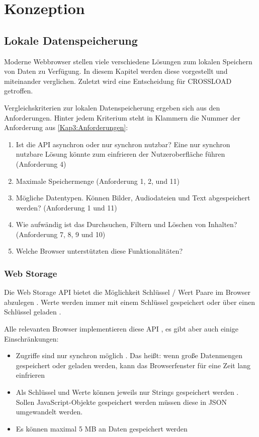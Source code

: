 \chapter{Konzeption}
\label{Kap4}

\section{Lokale Datenspeicherung}
Moderne Webbrowser stellen viele verschiedene Lösungen zum lokalen Speichern von Daten zu Verfügung. In diesem Kapitel werden diese vorgestellt und miteinander verglichen. Zuletzt wird eine Entscheidung für CROSSLOAD getroffen.

Vergleichskriterien zur lokalen Datenspeicherung ergeben sich aus den Anforderungen. Hinter jedem Kriterium steht in Klammern die Nummer der Anforderung aus \autoref{Kap3:Anforderungen}:
\begin{enumerate}
	\item Ist die \ac{API} asynchron oder nur synchron nutzbar? Eine nur synchron nutzbare Lösung könnte zum einfrieren der Nutzeroberfläche führen (Anforderung 4)
	\item Maximale Speichermenge (Anforderung 1, 2, und 11)
	\item Mögliche Datentypen. Können Bilder, Audiodateien und Text abgespeichert werden? (Anforderung 1 und 11)
	\item Wie aufwändig ist das Durchsuchen, Filtern und Löschen von Inhalten? (Anforderung 7, 8, 9 und 10)
	\item Welche Browser unterstützten diese Funktionalitäten?
\end{enumerate}

\subsection{Web Storage}
Die Web Storage \ac{API} bietet die Möglichkeit Schlüssel / Wert Paare im Browser abzulegen \autocite{mdn-web-storage}. Werte werden immer mit einem Schlüssel gespeichert oder über einen Schlüssel geladen \autocite{mdn-web-storage}.

Alle relevanten Browser implementieren diese \ac{API} \autocite{mdn-web-storage}, es gibt aber auch einige Einschränkungen:
\begin{itemize}
	\item Zugriffe sind nur synchron möglich \autocite{Hajian2019}. Das heißt: wenn große Datenmengen gespeichert oder geladen werden, kann das Browserfenster für eine Zeit lang einfrieren
	\item Als Schlüssel und Werte können jeweils nur Strings gespeichert werden \autocite{Hajian2019}. Sollen JavaScript-Objekte gespeichert werden müssen diese in JSON umgewandelt werden.
	\item Es können maximal 5 \ac{MB} an Daten gespeichert werden \autocite{mdn-web-storage}
\end{itemize}

